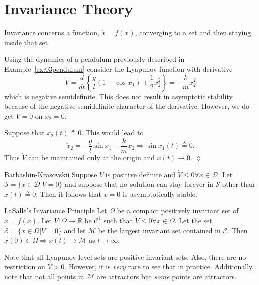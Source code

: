 \mainmatter%
\setcounter{page}{1}

\lectureseries[\course]{\course}

\date{February 9, 2010}

\setaddress%

\setcounter{lecture}{10}
\setcounter{chapter}{10}


\section{Invariance Theory}
Invariance concerns a function, $\dot{x}=f(x)$, converging to a set and then staying inside that set.

\begin{example}
Using the dynamics of a pendulum previously described in Example~\ref{ex:03pendulum} consider the Lyapunov function with derivative
$$\dot{V} = \frac{d}{dt}\left\{\frac{g}{l}\left(1-\cos x_1\right) + \frac{1}{2}x_2^2\right\} = -\frac{k}{m}x_2^2$$
which is negative semidefinite.
This does not result in asymptotic stability because of the negative semidefinite character of the derivative.
However, we do get $\dot{V}=0$ on $x_2=0$.

Suppose that $x_2(t)\triangleq0$.
This would lead to
$$\dot{x}_2 = -\frac{g}{l}\sin x_1 - \frac{k}{m}x_2 \Rightarrow \sin x_1(t) \triangleq 0.$$
Thus $\dot{V}$ can be maintained only at the origin and $x(t)\to0$.
$\lozenge$
\end{example}

\begin{theorem}{Barbashin-Krasovskii}
Suppose $V$ is positive definite and $\dot{V}\leq0 \forall x\in\mathcal{D}$.
Let $\mathcal{S}=\{x\in\mathcal{D} | \dot{V} = 0\}$ and suppose that no solution can stay forever in $\mathcal{S}$ other than $x(t)\triangleq0$.
Then it follows that $x=0$ is asymptotically stable.
\end{theorem}

\begin{theorem}{LaSalle's Invariance Principle}
Let $\Omega$ be a compact positively invariant set of $\dot{x}=f(x)$.
Let $V:\Omega\to\mathbb{R}$ be $\mathcal{C}^1$ such that $\dot{V}\leq0 \forall x \in \Omega$.
Let the set $\mathcal{E}=\{x\in\Omega | \dot{V}=0\}$ and let $\mathcal{M}$ be the largest invariant set contained in $\mathcal{E}$.
Then $x(0)\in\Omega \Rightarrow x(t)\to\mathcal{M}$ as $t\to\infty$.
\end{theorem}
Note that all Lyapunov level sets are positive invariant sets.
Also, there are no restriction on $V>0$.
However, it is \textit{very} rare to see that in practice.
Additionally, note that not all points in $\mathcal{M}$ are attractors but \textit{some} points are attractors.

